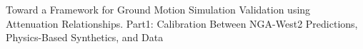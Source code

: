 % 
Toward a Framework for Ground Motion Simulation Validation using Attenuation Relationships. Part1: Calibration Between NGA-West2 Predictions, Physics-Based Synthetics, and Data
% 

